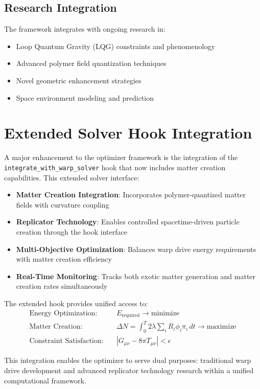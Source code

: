 \documentclass[11pt]{article}
\begin{document}
\subsection{Research Integration}
The framework integrates with ongoing research in:
\begin{itemize}
\item Loop Quantum Gravity (LQG) constraints and phenomenology
\item Advanced polymer field quantization techniques
\item Novel geometric enhancement strategies
\item Space environment modeling and prediction
\end{itemize}

\section{Extended Solver Hook Integration}

A major enhancement to the optimizer framework is the integration of the \texttt{integrate\_with\_warp\_solver} hook that now includes matter creation capabilities. This extended solver interface:

\begin{itemize}
\item \textbf{Matter Creation Integration}: Incorporates polymer-quantized matter fields with curvature coupling
\item \textbf{Replicator Technology}: Enables controlled spacetime-driven particle creation through the hook interface
\item \textbf{Multi-Objective Optimization}: Balances warp drive energy requirements with matter creation efficiency
\item \textbf{Real-Time Monitoring}: Tracks both exotic matter generation and matter creation rates simultaneously
\end{itemize}

The extended hook provides unified access to:
\begin{align}
\text{Energy Optimization:} &\quad E_{\text{required}} \to \text{minimize} \\
\text{Matter Creation:} &\quad \Delta N = \int_0^T 2\lambda \sum_i R_i \phi_i \pi_i \, dt \to \text{maximize} \\
\text{Constraint Satisfaction:} &\quad |G_{\mu\nu} - 8\pi T_{\mu\nu}| < \epsilon
\end{align}

This integration enables the optimizer to serve dual purposes: traditional warp drive development and advanced replicator technology research within a unified computational framework.
\end{document}
